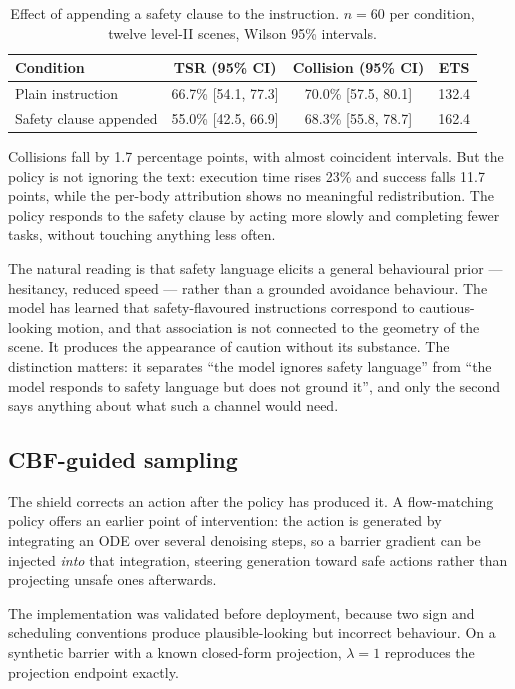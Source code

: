 \begin{table}[htbp]
\centering
\caption{Effect of appending a safety clause to the instruction. $n = 60$ per condition, twelve
  level-II scenes, Wilson 95\% intervals.}
\label{tab:language}
\begin{tabular}{lccc}
\toprule
\textbf{Condition} & \textbf{TSR (95\% CI)} & \textbf{Collision (95\% CI)} & \textbf{ETS} \\
\midrule
Plain instruction       & 66.7\% [54.1, 77.3] & 70.0\% [57.5, 80.1] & 132.4 \\
Safety clause appended  & 55.0\% [42.5, 66.9] & 68.3\% [55.8, 78.7] & 162.4 \\
\bottomrule
\end{tabular}
\end{table}

Collisions fall by 1.7 percentage points, with almost coincident intervals. But the policy is not
ignoring the text: execution time rises 23\% and success falls 11.7 points, while the per-body
attribution shows no meaningful redistribution. The policy responds to the safety clause by acting
more slowly and completing fewer tasks, without touching anything less often.

The natural reading is that safety language elicits a general behavioural prior --- hesitancy,
reduced speed --- rather than a grounded avoidance behaviour. The model has learned that
safety-flavoured instructions correspond to cautious-looking motion, and that association is not
connected to the geometry of the scene. It produces the appearance of caution without its
substance. The distinction matters: it separates ``the model ignores safety language'' from ``the
model responds to safety language but does not ground it'', and only the second says anything about
what such a channel would need.

\subsection*{CBF-guided sampling}

The shield corrects an action after the policy has produced it. A flow-matching policy offers an
earlier point of intervention: the action is generated by integrating an ODE over several denoising
steps, so a barrier gradient can be injected \emph{into} that integration, steering generation
toward safe actions rather than projecting unsafe ones afterwards.

The implementation was validated before deployment, because two sign and scheduling conventions
produce plausible-looking but incorrect behaviour. On a synthetic barrier with a known closed-form
projection, $\lambda = 1$ reproduces the projection endpoint exactly.

